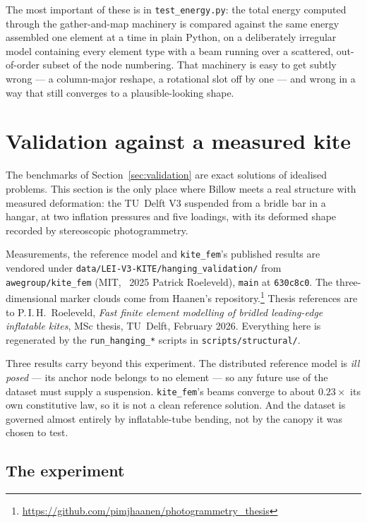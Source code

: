 \documentclass[11pt,a4paper]{article}
\newcommand{\code}[1]{\texttt{\small #1}}
\begin{document}
The most important of these is in \code{test\_energy.py}: the total energy
computed through the gather-and-map machinery is compared against the same
energy assembled one element at a time in plain Python, on a deliberately
irregular model containing every element type with a beam running over a
scattered, out-of-order subset of the node numbering. That machinery is easy to
get subtly wrong --- a column-major reshape, a rotational slot off by one ---
and wrong in a way that still converges to a plausible-looking shape.

\section{Validation against a measured kite}
\label{sec:hanging}

The benchmarks of Section~\ref{sec:validation} are exact solutions of idealised
problems. This section is the only place where Billow meets a real structure
with measured deformation: the TU~Delft V3 suspended from a bridle bar in a
hangar, at two inflation pressures and five loadings, with its deformed shape
recorded by stereoscopic photogrammetry.

Measurements, the reference model and \code{kite\_fem}'s published results are
vendored under \code{data/LEI-V3-KITE/hanging\_validation/} from
\code{awegroup/kite\_fem} (MIT, \textcopyright~2025 Patrick Roeleveld),
\code{main} at \code{630c8c0}. The three-dimensional marker clouds come from
Haanen's repository.\footnote{%
\url{https://github.com/pimjhaanen/photogrammetry_thesis}}
Thesis references are to P.\,I.\,H.~Roeleveld, \emph{Fast finite element
modelling of bridled leading-edge inflatable kites}, MSc thesis, TU~Delft,
February 2026. Everything here is regenerated by the \code{run\_hanging\_*}
scripts in \code{scripts/structural/}.

Three results carry beyond this experiment. The distributed reference model is
\emph{ill posed} --- its anchor node belongs to no element --- so any future use
of the dataset must supply a suspension. \code{kite\_fem}'s beams converge to
about $0.23\times$ its own constitutive law, so it is not a clean reference
solution. And the dataset is governed almost entirely by inflatable-tube
bending, not by the canopy it was chosen to test.

\subsection{The experiment}
\end{document}
